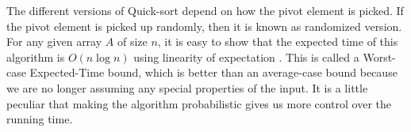 The different versions of Quick-sort depend on how the pivot element is picked.
If the pivot element is picked up randomly, then it is known as randomized version.
For any given array $A$ of size $n$, it is easy to show that the expected time of this algorithm is $O(n \log n)$ using linearity of expectation \citep{motwani2010randomized}.
This is called a Worst-case Expected-Time bound, which is better than an average-case bound because we are no longer assuming any special properties
of the input. It is a little peculiar that making the algorithm probabilistic gives us more control over the running time.
% 
% 
% 
